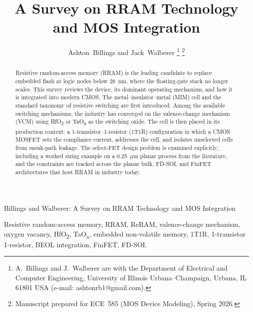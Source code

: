 \documentclass[lettersize,journal]{IEEEtran}
\begin{document}
\title{A Survey on RRAM Technology and MOS Integration}

\author{Ashton~Billings and Jack~Walberer%
\thanks{A.~Billings and J.~Walberer are with the Department of Electrical and Computer Engineering, University of Illinois Urbana--Champaign, Urbana, IL 61801 USA (e-mail: ashtonrb1@gmail.com).}%
\thanks{Manuscript prepared for ECE~585 (MOS Device Modeling), Spring 2026.}}

%
{Billings and Walberer: A Survey on RRAM Technology and MOS Integration}

\maketitle

\begin{abstract}
Resistive random-access memory (RRAM) is the leading candidate to replace embedded flash at logic nodes below 28~nm, where the floating-gate stack no longer scales. This survey reviews the device, its dominant operating mechanism, and how it is integrated into modern CMOS. The metal--insulator--metal (MIM) cell and the standard taxonomy of resistive switching are first introduced. Among the available switching mechanisms, the industry has converged on the valence-change mechanism (VCM) using HfO\textsubscript{2} or TaO\textsubscript{x} as the switching oxide. The cell is then placed in its production context: a 1-transistor--1-resistor (1T1R) configuration in which a CMOS MOSFET sets the compliance current, addresses the cell, and isolates unselected cells from sneak-path leakage. The select-FET design problem is examined explicitly, including a worked sizing example on a 0.25~$\mu$m planar process from the literature, and the constraints are tracked across the planar bulk, FD-SOI, and FinFET architectures that host RRAM in industry today.
\end{abstract}

\begin{IEEEkeywords}
Resistive random-access memory, RRAM, ReRAM, valence-change mechanism, oxygen vacancy, HfO\textsubscript{2}, TaO\textsubscript{x}, embedded non-volatile memory, 1T1R, 1-transistor 1-resistor, BEOL integration, FinFET, FD-SOI.
\end{IEEEkeywords}
\end{document}
